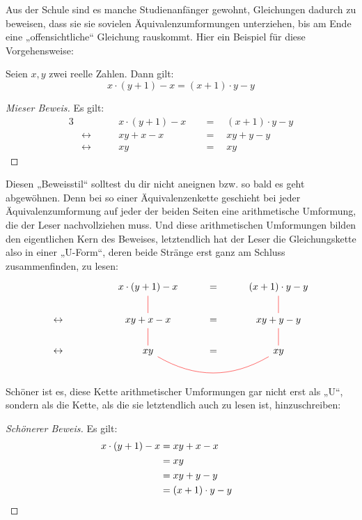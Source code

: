\begin{bem}[„Gleichungs-U's“]
    Aus der Schule sind es manche Studienanfänger gewohnt, Gleichungen dadurch zu beweisen, dass sie sie sovielen Äquivalenzumformungen unterziehen, bis am Ende eine „offensichtliche“ Gleichung rauskommt. Hier ein Beispiel für diese Vorgehensweise:
    \begin{bsp}
    Seien $x,y$ zwei reelle Zahlen. Dann gilt:
        \[ x\cdot (y+1)-x = (x+1)\cdot y-y\]
    \end{bsp}
    \begin{proof}[Mieser Beweis]\let\qed\relax
        Es gilt:
        \begin{alignat*}{3}
            && x\cdot (y+1)-x& \quad=\quad (x+1)\cdot y-y \\
            &\leftrightarrow\qquad& xy + x  -x& \quad=\quad xy + y - y \\
            &\leftrightarrow\qquad& xy & \quad=\quad xy
        \end{alignat*}
    \end{proof}
    Diesen „Beweisstil“ solltest du dir nicht aneignen bzw. so bald es geht abgewöhnen. Denn bei so einer Äquivalenzenkette geschieht bei jeder Äquivalenzumformung auf jeder der beiden Seiten eine arithmetische Umformung, die der Leser nachvollziehen muss. Und diese arithmetischen Umformungen bilden den eigentlichen Kern des Beweises, letztendlich hat der Leser die Gleichungskette also in einer „U-Form“, deren beide Stränge erst ganz am Schluss zusammenfinden, zu lesen:
    \[\begin{tikzcd}
        && x\cdot (y+1)-x\ar[red, d, dash] & =& (x+1)\cdot y-y \ar[red, d, dash] \\
        \leftrightarrow&& xy + x-x  \ar[red, d, dash] & =& xy + y - y \ar[red, d, dash] \\
        \leftrightarrow&& xy \ar[red, rr, dash, bend right] & =& xy
    \end{tikzcd}\]
    Schöner ist es, diese Kette arithmetischer Umformungen gar nicht erst als „U“, sondern als die Kette, als die sie letztendlich auch zu lesen ist, hinzuschreiben:
    \begin{proof}[Schönerer Beweis]
        Es gilt:
        \begin{align*}
            x\cdot (y+1) -x& = xy + x -x\\
            & = xy  \\
            & = xy + y - y \\
            & = (x+1)\cdot y -y  &&&& \qedhere
        \end{align*}

\end{proof}
\end{bem}
